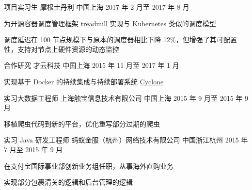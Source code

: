 \begin{cventries}
  \cventry
    {项目实习生} %
    {摩根士丹利} %
    {中国上海} %
    {2017 年 2 月至 2017 年 8 月} %
    {
      \begin{cvitems} %
        \item 为开源容器调度管理框架 treadmill 实现与 Kubernetes 类似的调度模型
        \item 调度延迟在 100 节点规模下与原本的调度器相比下降 12\%，但增强了其可配置性，支持对节点上硬件资源的动态监控
      \end{cvitems}
    }

  \cventry
    {合作研究} %
    {才云科技} %
    {中国上海} %
    {2015 年 11 月至 2017 年 1 月} %
    {
      \begin{cvitems} %
        \item 实现基于 Docker 的持续集成与持续部署系统 \href{https://github.com/caicloud/cyclone}{Cyclone}
      \end{cvitems}
    }

  \cventry
    {实习大数据工程师} %
    {上海触宝信息技术有限公司} %
    {中国上海} %
    {2015 年 9 月至 2015 年 9 月} %
    {
      \begin{cvitems} %
        \item 移植爬虫代码到新的平台，优化重写部分过期的爬虫
      \end{cvitems}
    }

  \cventry
    {实习 Java 研发工程师} %
    {蚂蚁金服（杭州）网络技术有限公司} %
    {中国浙江杭州} %
    {2015 年 7 月至 2015 年 9 月} %
    {
      \begin{cvitems} %
        \item 在支付宝国际事业部创新业务组任职，从事海外直购业务
        \item 实现部分包裹清关的逻辑和后台管理的逻辑
      \end{cvitems}
    }

\end{cventries}
